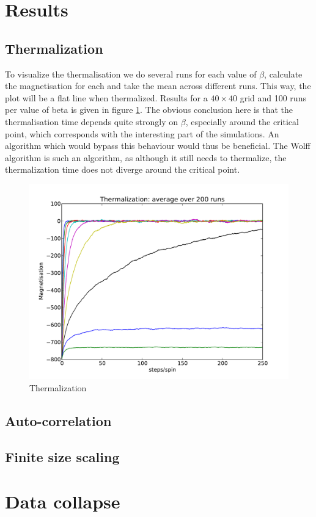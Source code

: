 \documentclass[11pt,twocolumn]{article}
\begin{document}
\section{Results}
\subsection{Thermalization}
To visualize the thermalisation we do several runs for each value of $\beta$, calculate the magnetisation for each and take the mean across different runs. This way, the plot will be a flat line when thermalized. Results for a $40\times40$ grid and 100 runs per value of beta is given in figure \ref{therm}. The obvious conclusion here is that the thermalisation time depends quite strongly on $\beta$, especially around the critical point, which corresponds with the interesting part of the simulations. An algorithm which would bypass this behaviour would thus be beneficial. The Wolff algorithm is such an algorithm, as although it still needs to thermalize, the thermalization time does not diverge around the critical point.
\begin{figure}[!ht]
\centering \includegraphics[width=\columnwidth]{figs/therm.pdf}
\caption{Thermalization}
\label{therm}
\end{figure}
\subsection{Auto-correlation}
\subsection{Finite size scaling}
\section{Data collapse}
{}

\end{document}
